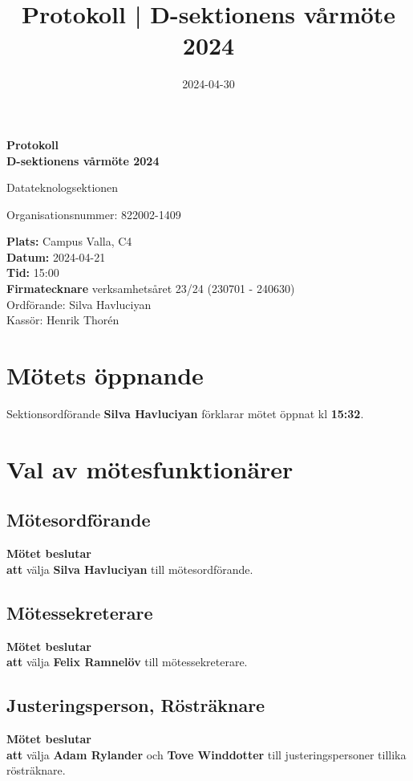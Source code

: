 \documentclass{datateknologsektionen-document}
\title{Protokoll | D-sektionens vårmöte 2024}
\date{2024-04-30}
\newcommand{\ind}{\hspace*{2em}}
\newcommand{\motetbeslutar}{\textbf{Mötet beslutar}}
\newcommand{\att}{\\\ind\textbf{att}}
\begin{document}
\hspace{0pt}
\vfill
\begin{center}
	\Huge\textbf{Protokoll \\ D-sektionens vårmöte 2024}

	\huge Datateknologsektionen

	\large
	Organisationsnummer: 822002-1409

\end{center}
\vfill
{\large
	\textbf{Plats:} Campus Valla, C4 \\
	\textbf{Datum:} 2024-04-21 \\
	\textbf{Tid:} 15:00 \\
	\textbf{Firmatecknare} verksamhetsåret 23/24 (230701 - 240630) \\
	\ind Ordförande: Silva Havluciyan \\
	\ind Kassör: Henrik Thorén
}
\vfill
\hspace{0pt}
\pagebreak




\tableofcontents
\pagebreak





\section{Mötets öppnande}
Sektionsordförande \textbf{Silva Havluciyan} förklarar mötet öppnat kl \textbf{15:32}.




\section{Val av mötesfunktionärer}
\subsection{Mötesordförande}
\motetbeslutar\att{} välja \textbf{Silva Havluciyan} till mötesordförande.

\subsection{Mötessekreterare}
\motetbeslutar\att{} välja \textbf{Felix Ramnelöv} till mötessekreterare.

\subsection{Justeringsperson, Rösträknare}
\motetbeslutar\att{} välja \textbf{Adam Rylander} och \textbf{Tove Winddotter} till justeringspersoner tillika rösträknare.
\end{document}
